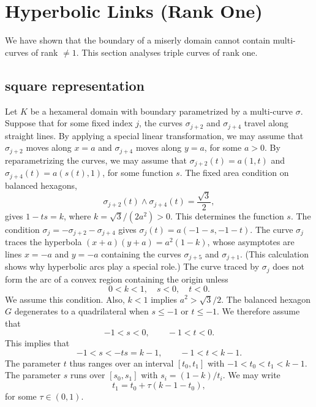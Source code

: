 \documentclass[11pt]{amsart}
\def\ta{{\tau}}
\begin{document}
\section{Hyperbolic Links (Rank One)}

We have shown that the boundary of a miserly domain cannot
contain multi-curves of rank $\ne 1$.  This section analyses triple
curves of rank one.


\subsection{square representation}

Let $K$ be a hexameral domain with boundary parametrized by a
multi-curve $\sigma$.  Suppose that for some fixed index $j$, the curves
$\sigma_{j+2}$ and $\sigma_{j+4}$ travel along straight lines.  By
applying a special linear transformation, we may assume that
$\sigma_{j+2}$ moves along $x=a$ and $\sigma_{j+4}$ moves along $y=a$,
for some $a>0$.  By reparametrizing the curves, we may assume that
$\sigma_{j+2}(t) = a(1,t)$ and $\sigma_{j+4}(t) = a(s(t),1)$, for some
function $s$.  The fixed area condition on balanced hexagons,
\begin{equation}
{\sigma_{j+2}(t)}\land{\sigma_{j+4}(t)}=\frac{\sqrt{3}}2,
\end{equation}
gives $1- t s = k$, where $k=\sqrt3/(2a^2) > 0$.  This determines the
function $s$.  The condition $\sigma_{j} = -\sigma_{j+2}
-\sigma_{j+4}$ gives $\sigma_{j}(t) = a (-1-s,-1-t)$.  The curve
$\sigma_{j}$ traces the hyperbola $(x+a)(y+a) = a^2(1-k)$, whose
asymptotes are lines $x=-a$ and $y=-a$ containing the curves
$\sigma_{j+5}$ and $\sigma_{j+1}$.  (This calculation shows why
hyperbolic arcs play a special role.)  The curve traced by
$\sigma_{j}$ does not form the arc of a convex region containing the
origin unless
   \begin{equation}
   0 < k < 1,\quad s<0,\quad t < 0.
   \end{equation}
We assume this condition.
Also, $k<1$ implies $a^2 > \sqrt3/2$.  The balanced hexagon $G$ degenerates
to a quadrilateral when $s \le -1$ or $t\le -1$.  We therefore assume
that 
\begin{equation}
-1<s < 0,\qquad -1 < t < 0.
\end{equation}
  This implies that
\begin{equation}
-1 < s < -t s = k-1,\qquad -1 < t < k-1.
\end{equation}  
The parameter $t$ thus ranges
over an interval $[t_0,t_1]$ with $-1 < t_0 < t_1 < k-1$.  The parameter
$s$ runs over $[s_0,s_1]$ with $s_i = (1-k)/t_i$.  We may
write 
\begin{equation}
t_1 = t_0 + \ta (k-1-t_0),
\end{equation}
for some $\ta\in (0,1)$.
\end{document}
